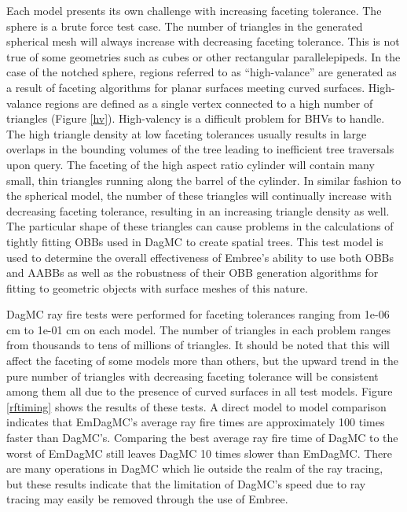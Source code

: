 \documentclass{anstrans}
\begin{document}
Each model presents its own challenge with increasing faceting tolerance. The sphere is a brute force test case. The number of triangles in the generated spherical mesh will always increase with decreasing faceting tolerance. This is not true of some geometries such as cubes or other rectangular parallelepipeds. In the case of the notched sphere, regions referred to as ``high-valance'' are generated as a result of faceting algorithms for planar surfaces meeting curved surfaces. High-valance regions are defined as a single vertex connected to a high number of triangles (Figure \ref{hv}). High-valency is a difficult problem for BHVs to handle. The high triangle density at low faceting tolerances usually results in large overlaps in the bounding volumes of the tree leading to inefficient tree traversals upon query. The faceting of the high aspect ratio cylinder will contain many small, thin triangles running along the barrel of the cylinder. In similar fashion to the spherical model, the number of these triangles will continually increase with decreasing faceting tolerance, resulting in an increasing triangle density as well. The particular shape of these triangles can cause problems in the calculations of tightly fitting OBBs used in DagMC to create spatial trees. This test model is used to determine the overall effectiveness of Embree's ability to use both OBBs and AABBs as well as the robustness of their OBB generation algorithms for fitting to geometric objects with surface meshes of this nature.

DagMC ray fire tests were performed for faceting tolerances ranging from 1e-06 cm to 1e-01 cm on each model. The number of triangles in each problem ranges from thousands to tens of millions of triangles. It should be noted that this will affect the faceting of some models more than others, but the upward trend in the pure number of triangles with decreasing faceting tolerance will be consistent among them all due to the presence of curved surfaces in all test models. Figure \ref{rftiming} shows the results of these tests. A direct model to model comparison indicates that EmDagMC's average ray fire times are approximately 100 times faster than DagMC's. Comparing the best average ray fire time of DagMC to the worst of EmDagMC still leaves DagMC 10 times slower than EmDagMC. There are many operations in DagMC which lie outside the realm of the ray tracing, but these results indicate that the limitation of DagMC's speed due to ray tracing may easily be removed through the use of Embree.
\end{document}
